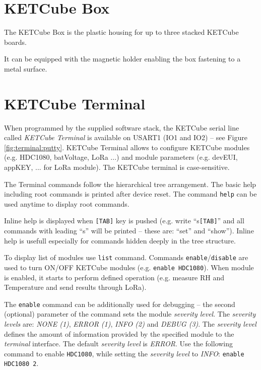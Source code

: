 \section{KETCube Box}

 The KETCube Box is the plastic housing for up to three stacked KETCube boards.
 
 It can be equipped with the magnetic holder enabling the box fastening to a metal surface.

\clearpage
\section{KETCube Terminal}
When programmed by the supplied software stack, the KETCube serial line called {\it KETCube Terminal} is available on USART1 (IO1 and IO2) -- see Figure \ref{fig:terminal:putty}. KETCube Terminal allows to configure KETCube modules (e.g. HDC1080, batVoltage, LoRa ...) and module parameters (e.g. devEUI, appKEY, ... for LoRa module). The KETCube terminal is case-sensitive.

The Terminal commands follow the hierarchical tree arrangement. The basic help including root commands is printed after device reset. The command {\tt help} can be used anytime to display root commands.

Inline help is displayed when {\tt [TAB]} key is pushed (e.g. write “s{\tt [TAB]}” and all commands with leading “s” will be printed -- these are: “set” and “show”). Inline help is usefull especially for commands hidden deeply in the tree structure.

To display list of modules use {\tt list} command. Commands {\tt enable}/{\tt disable} are used to turn ON/OFF KETCube modules (e.g. {\tt enable HDC1080}). When module is enabled, it starts to perform defined operation (e.g. measure RH and Temperature and send results through LoRa). 

The {\tt enable} command can be additionally used for debugging -- the second (optional) parameter of the command sets the module {\it severity level}. The {\it severity levels} are: {\it NONE (1)}, {\it ERROR (1)}, {\it INFO (2)} and {\it DEBUG (3)}. The {\it severity level} defines the amount of information provided by the specified module to the {\it terminal} interface. The default  {\it severity level} is {\it ERROR}. Use the following command to enable {\tt HDC1080}, while setting the {\it severity level} to {\it INFO}: {\tt enable HDC1080 2}.

